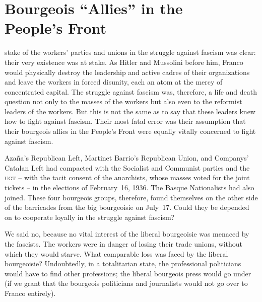 \chapter[Bourgeois “Allies” in the People's Front]{Bourgeois “Allies” in the \\ People's Front}

 stake of the workers’ parties and unions in the struggle against fascism was clear: their very existence was at stake. As Hitler and Mussolini before him, Franco{\indexFFranco} would physically destroy the leadership and active cadres of their organizations and leave the workers in forced disunity, each an atom at the mercy of concentrated capital. The struggle against fascism was, therefore, a life and death question not only to the masses of the workers but also even to the reformist leaders of the workers. But this is not the same as to say that these leaders knew how to fight against fascism. Their most fatal error was their assumption that their bourgeois allies in the People’s Front were equally vitally concerned to fight against fascism.

\indexMAzana{}\indexLCompanys
Azaña's Republican Left, Martinet Barrio's Republican Union, and Companys' Catalan Left had compacted with the Socialist and Communist parties and the \textsc{ugt} -- with the tacit consent of the anarchists, whose masses voted for the joint tickets -- in the elections of February~16, 1936. The Basque Nationalists had also joined. These four bourgeois groups, therefore, found themselves on the other side of the barricades from the big bourgeoisie on July~17. Could they be depended on to cooperate loyally in the struggle against fascism?

We said no, because no vital interest of the liberal bourgeoisie was menaced by the fascists. The workers were in danger of losing their trade unions, without which they would starve. What comparable loss was faced by the liberal bourgeoisie? Undoubtedly, in a totalitarian state, the professional politicians would have to find other professions; the liberal bourgeois press would go under (if we grant that the bourgeois politicians and journalists would not go over to Franco entirely).

